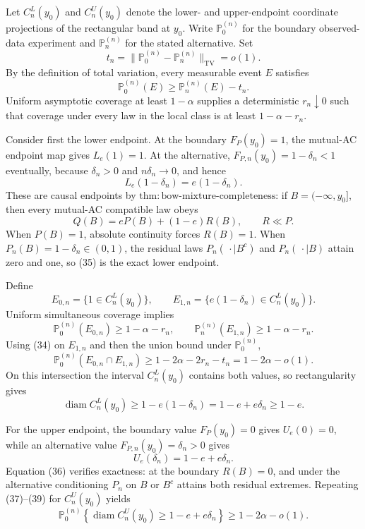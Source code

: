 Let \(C_n^L(y_0)\) and \(C_n^U(y_0)\) denote the lower- and upper-endpoint coordinate projections of the rectangular band at \(y_0\).  Write \(\mathbb P_0^{(n)}\) for the boundary observed-data experiment and \(\mathbb P_n^{(n)}\) for the stated alternative.  Set
\[
 t_n=\|\mathbb P_0^{(n)}-\mathbb P_n^{(n)}\|_{\mathrm{TV}}=o(1).
\]
By the definition of total variation, every measurable event \(E\) satisfies
\[
 \mathbb P_0^{(n)}(E)\ge\mathbb P_n^{(n)}(E)-t_n. \tag{34}
\]
Uniform asymptotic coverage at least \(1-\alpha\) supplies a deterministic \(r_n\downarrow0\) such that coverage under every law in the local class is at least \(1-\alpha-r_n\).

Consider first the lower endpoint.  At the boundary \(F_P(y_0)=1\), the mutual-AC endpoint map gives \(L_e(1)=1\).  At the alternative, \(F_{P,n}(y_0)=1-\delta_n<1\) eventually, because \(\delta_n>0\) and \(n\delta_n\to0\), and hence
\[
 L_e(1-\delta_n)=e(1-\delta_n). \tag{35}
\]
These are causal endpoints by \(\mathrm{thm:bow\text{-}mixture\text{-}completeness}\): if \(B=(-\infty,y_0]\), then every mutual-AC compatible law obeys
\[
 Q(B)=eP(B)+(1-e)R(B),\qquad R\ll P. \tag{36}
\]
When \(P(B)=1\), absolute continuity forces \(R(B)=1\).  When \(P_n(B)=1-\delta_n\in(0,1)\), the residual laws \(P_n(\,\cdot\mid B^c)\) and \(P_n(\,\cdot\mid B)\) attain zero and one, so (35) is the exact lower endpoint.

Define
\[
 E_{0,n}=\{1\in C_n^L(y_0)\},
 \qquad
 E_{1,n}=\{e(1-\delta_n)\in C_n^L(y_0)\}.
\]
Uniform simultaneous coverage implies
\[
 \mathbb P_0^{(n)}(E_{0,n})\ge1-\alpha-r_n,
 \qquad
 \mathbb P_n^{(n)}(E_{1,n})\ge1-\alpha-r_n. \tag{37}
\]
Using (34) on \(E_{1,n}\) and then the union bound under \(\mathbb P_0^{(n)}\),
\[
 \mathbb P_0^{(n)}(E_{0,n}\cap E_{1,n})
 \ge1-2\alpha-2r_n-t_n=1-2\alpha-o(1). \tag{38}
\]
On this intersection the interval \(C_n^L(y_0)\) contains both values, so rectangularity gives
\[
 \operatorname{diam}C_n^L(y_0)
 \ge1-e(1-\delta_n)=1-e+e\delta_n\ge1-e. \tag{39}
\]

For the upper endpoint, the boundary value \(F_P(y_0)=0\) gives \(U_e(0)=0\), while an alternative value \(F_{P,n}(y_0)=\delta_n>0\) gives
\[
 U_e(\delta_n)=1-e+e\delta_n. \tag{40}
\]
Equation (36) verifies exactness: at the boundary \(R(B)=0\), and under the alternative conditioning \(P_n\) on \(B\) or \(B^c\) attains both residual extremes.  Repeating (37)--(39) for \(C_n^U(y_0)\) yields
\[
 \mathbb P_0^{(n)}\left\{\operatorname{diam}C_n^U(y_0)\ge1-e+e\delta_n\right\}
 \ge1-2\alpha-o(1). \tag{41}
\]

